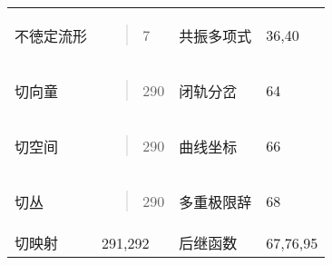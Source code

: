 \begin{longtable}[]{@{}llll@{}}
\begin{minipage}[t]{0.22\columnwidth}\raggedright
不徳定流形\strut
\end{minipage} & \begin{minipage}[t]{0.22\columnwidth}\raggedright
\begin{quote}
7
\end{quote}\strut
\end{minipage} & \begin{minipage}[t]{0.22\columnwidth}\raggedright
共振多项式\strut
\end{minipage} & \begin{minipage}[t]{0.22\columnwidth}\raggedright
36,40\strut
\end{minipage}\tabularnewline
\begin{minipage}[t]{0.22\columnwidth}\raggedright
切向童\strut
\end{minipage} & \begin{minipage}[t]{0.22\columnwidth}\raggedright
\begin{quote}
290
\end{quote}\strut
\end{minipage} & \begin{minipage}[t]{0.22\columnwidth}\raggedright
闭轨分岔\strut
\end{minipage} & \begin{minipage}[t]{0.22\columnwidth}\raggedright
64\strut
\end{minipage}\tabularnewline
\begin{minipage}[t]{0.22\columnwidth}\raggedright
切空间\strut
\end{minipage} & \begin{minipage}[t]{0.22\columnwidth}\raggedright
\begin{quote}
290
\end{quote}\strut
\end{minipage} & \begin{minipage}[t]{0.22\columnwidth}\raggedright
曲线坐标\strut
\end{minipage} & \begin{minipage}[t]{0.22\columnwidth}\raggedright
66\strut
\end{minipage}\tabularnewline
\begin{minipage}[t]{0.22\columnwidth}\raggedright
切丛\strut
\end{minipage} & \begin{minipage}[t]{0.22\columnwidth}\raggedright
\begin{quote}
290
\end{quote}\strut
\end{minipage} & \begin{minipage}[t]{0.22\columnwidth}\raggedright
多重极限辞\strut
\end{minipage} & \begin{minipage}[t]{0.22\columnwidth}\raggedright
68\strut
\end{minipage}\tabularnewline
切映射 & 291,292 & 后继函数 & 67,76,95\tabularnewline
\bottomrule
\end{longtable}

